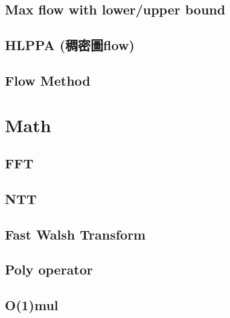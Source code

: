 \documentclass[a4paper,10pt,twocolumn,oneside]{article}
\begin{document}
\subsection{Max flow with lower/upper bound}


% 

\subsection{HLPPA (稠密圖flow)}


\subsection{Flow Method}


\section{Math}
\subsection{FFT}


\subsection{NTT}


\subsection{Fast Walsh Transform}


\subsection{Poly operator}


\subsection{O(1)mul}


% 
\end{document}
